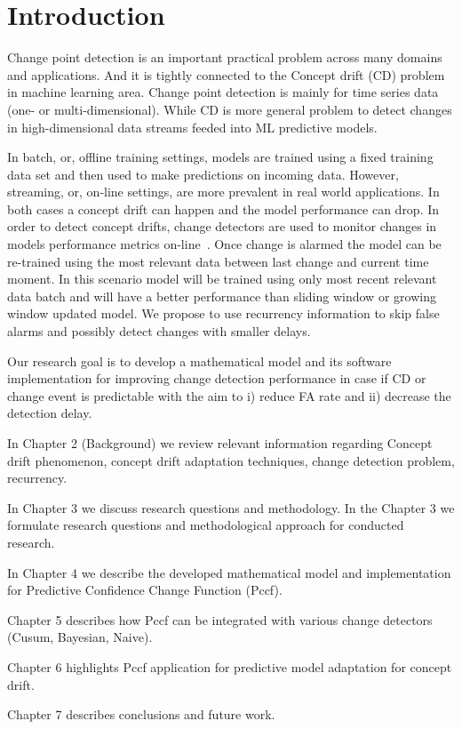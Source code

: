 \chapter{Introduction}

Change point detection is an important practical problem across many domains and applications.
And it is tightly connected to the Concept drift (CD) problem in machine learning area.
Change point detection is mainly for time series data (one- or multi-dimensional).
While CD is more general problem to detect changes in high-dimensional data streams feeded into ML predictive models.



In batch, or, offline training settings, models are trained using a fixed training data set and then used to make predictions on incoming data. 
However, streaming, or, on-line settings, are more prevalent in real world applications. 
In both cases a concept drift can happen and the model performance can drop. 
In order to detect concept drifts, change detectors are used to monitor changes in models performance metrics on-line~\cite{gama2004learning}. 
Once change is alarmed the model can be re-trained using the most relevant data between last change and current time moment.
In this scenario model will be trained using only most recent relevant data batch and will have a better performance than sliding window or growing window updated model.
We propose to use recurrency information to skip false alarms and possibly detect changes with smaller delays.

Our research goal is to develop a mathematical model and its software implementation for improving change detection performance in case if CD or change event is predictable with the aim to i) reduce FA rate and ii) decrease the detection delay. 


In Chapter 2 (Background) we review relevant information regarding Concept drift phenomenon, concept drift adaptation techniques, change detection problem, recurrency.

In Chapter 3 we discuss research questions and methodology.
In the Chapter 3 we formulate research questions and methodological approach for conducted research. 

In Chapter 4 we describe the developed mathematical model and implementation for Predictive Confidence Change Function (Pccf).

Chapter 5 describes how Pccf can be integrated with various change detectors (Cusum, Bayesian, Naive). 

Chapter 6 highlights Pccf application for predictive model adaptation for concept drift. 

Chapter 7 describes conclusions and future work.
